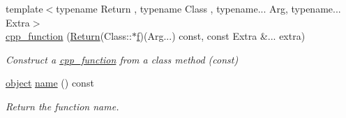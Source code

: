 \begin{DoxyCompactItemize}
{\footnotesize template$<$typename Return , typename Class , typename... Arg, typename... Extra$>$ }\\\mbox{\hyperlink{classcpp__function_adf1a5ad6ed0992a0bd07c2048b98d6f1}{cpp\+\_\+function}} (\mbox{\hyperlink{_python-ast_8h_abdae7f49d66ce8e500825bb53aa14901}{Return}}(Class\+::$\ast$\mbox{\hyperlink{_s_d_l__opengl__glext_8h_a691492ec0bd6383f91200e49f6ae40ed}{f}})(Arg...) const, const Extra \&... extra)
\begin{DoxyCompactList}\small\item\em Construct a \mbox{\hyperlink{classcpp__function}{cpp\+\_\+function}} from a class method (const) \end{DoxyCompactList}\item 
\mbox{\hyperlink{classobject}{object}} \mbox{\hyperlink{classcpp__function_a5d8bcdd6781aa6da434299589c68013e}{name}} () const
\begin{DoxyCompactList}\small\item\em Return the function name. \end{DoxyCompactList}\end{DoxyCompactItemize}
